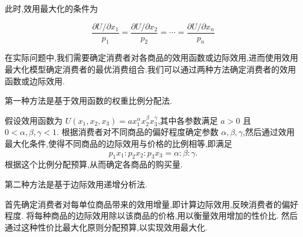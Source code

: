 \documentclass{article}
\begin{document}
此时,效用最大化的条件为

\begin{equation}
    \frac{\partial U/ \partial x_1}{p_1} = \frac{\partial U/ \partial x_2}{p_2} = \cdots = \frac{\partial U/ \partial x_n}{p_n}
\end{equation}


在实际问题中,我们需要确定消费者对各商品的效用函数或边际效用,进而使用效用最大化模型确定消费者的最优消费组合.我们可以通过两种方法确定消费者的效用函数或边际效用.

第一种方法是基于效用函数的权重比例分配法.

假设效用函数为 \( U(x_1, x_2, x_3) = a x_1^{\alpha} x_2^{\beta} x_3^{\gamma} \),其中各参数满足 \( a > 0 \) 且 \( 0 < \alpha, \beta, \gamma < 1 \).
根据消费者对不同商品的偏好程度确定参数 \( \alpha, \beta, \gamma \),然后通过效用最大化条件,使得不同商品的边际效用与价格的比例相等,即满足
\[
p_1 x_1 : p_2 x_2 : p_3 x_3 = \alpha : \beta : \gamma.
\]
根据这个比例分配预算,从而确定各商品的购买量.

第二种方法是基于边际效用递增分析法.

首先确定消费者对每单位商品带来的效用增量,即计算边际效用,反映消费者的偏好程度.
将每种商品的边际效用除以该商品的价格,用以衡量效用增加的性价比.
然后通过这种性价比最大化原则分配预算,以实现效用最大化.
\end{document}
